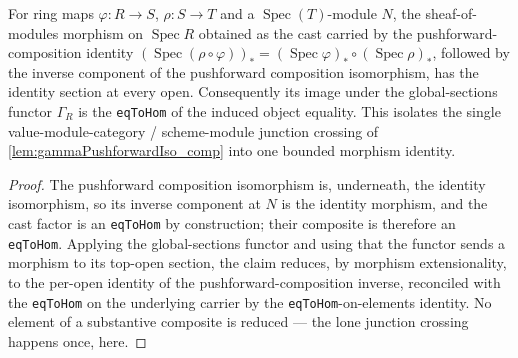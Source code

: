 \begin{lemma}

  \label{lem:gammaPushforwardIso_comp_bridge}
  For ring maps \(\varphi : R \to S\), \(\rho : S \to T\) and a
  \(\operatorname{Spec}(T)\)-module \(N\), the sheaf-of-modules morphism on
  \(\operatorname{Spec} R\) obtained as the cast carried by the pushforward-composition
  identity \((\operatorname{Spec}(\rho\circ\varphi))_* = (\operatorname{Spec}\varphi)_*\circ
  (\operatorname{Spec}\rho)_*\), followed by the inverse component of the pushforward
  composition isomorphism, has the identity section at every open. Consequently its image
  under the global-sections functor \(\Gamma_R\) is the \texttt{eqToHom} of the induced
  object equality. This isolates the single value-module-category / scheme-module junction
  crossing of \cref{lem:gammaPushforwardIso_comp} into one bounded morphism identity.
\end{lemma}

\begin{proof}
  The pushforward composition isomorphism is, underneath, the identity isomorphism, so its
  inverse component at \(N\) is the identity morphism, and the cast factor is an
  \texttt{eqToHom} by construction; their composite is therefore an \texttt{eqToHom}.
  Applying the global-sections functor and using that the functor sends a morphism to its
  top-open section, the claim reduces, by morphism extensionality, to the per-open identity
  of the pushforward-composition inverse, reconciled with the \texttt{eqToHom} on the
  underlying carrier by the \texttt{eqToHom}-on-elements identity. No element of a
  substantive composite is reduced — the lone junction crossing happens once, here.
\end{proof}

